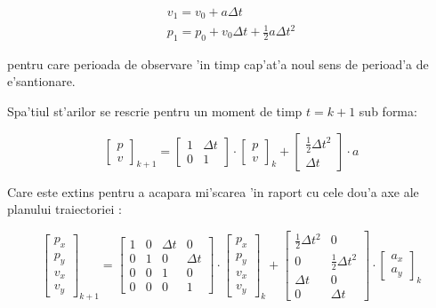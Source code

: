 \documentclass[12pt,a4paper,twoside]{report}
\begin{document}
\begin{gather}
    v_1 = v_0 + a \Delta t \\
    p_1 = p_0 + v_0 \Delta t + \frac{1}{2} a \Delta t^2
\end{gather}

pentru care perioada de observare 'in timp cap'at'a noul sens de perioad'a de e'santionare.

Spa'tiul st'arilor se rescrie pentru un moment de timp $t=k+1$ sub forma:

\begin{equation}
     \begin{bmatrix} p \\ v \end{bmatrix}_{k+1} =  \begin{bmatrix} 1 & \Delta t \\ 0 & 1 \end{bmatrix} \cdot \begin{bmatrix} p \\ v \end{bmatrix}_k +  \begin{bmatrix} \frac{1}{2} \Delta t^2 \\ \Delta t \end{bmatrix} \cdot a 
\end{equation}

Care este extins pentru a acapara mi'scarea 'in raport cu cele dou'a axe ale planului traiectoriei \cite{MultiDimKF}:

\begin{equation}
    \begin{bmatrix} p_x \\ p_y \\ v_x \\ v_y \end{bmatrix}_{k+1}  =  \begin{bmatrix} 1 & 0 & \Delta t & 0 \\ 0 & 1 & 0 & \Delta t\\ 0 & 0 & 1 & 0 \\ 0 & 0 & 0 & 1\end{bmatrix} \cdot \begin{bmatrix} p_x \\ p_y \\ v_x \\ v_y \end{bmatrix}_{k} +  \begin{bmatrix} \frac{1}{2} \Delta t^2 & 0  \\0 & \frac{1}{2} \Delta t^2 \\ \Delta t & 0  \\0 &  \Delta t \end{bmatrix} \cdot \begin{bmatrix}
    a_x \\ a_y \end{bmatrix}_k
\end{equation}
\end{document}
